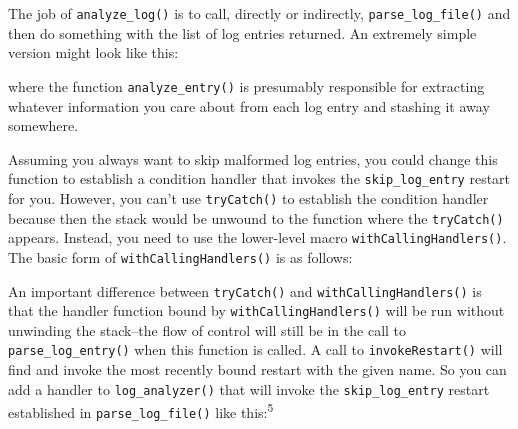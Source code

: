 \begin{Shaded}
\begin{Highlighting}[]
\StringTok{ }
  \StringTok{ }\NormalTok{()}
\NormalTok{\}}
\end{Highlighting}
\end{Shaded}

The job of \texttt{analyze\_log()} is to call, directly or indirectly,
\texttt{parse\_log\_file()} and then do something with the list of log
entries returned. An extremely simple version might look like this:

\begin{Shaded}
\begin{Highlighting}[]
\StringTok{ }
  \StringTok{ }
\NormalTok{\}}
\end{Highlighting}
\end{Shaded}

where the function \texttt{analyze\_entry()} is presumably responsible
for extracting whatever information you care about from each log entry
and stashing it away somewhere.

Assuming you always want to skip malformed log entries, you could change
this function to establish a condition handler that invokes the
\texttt{skip\_log\_entry} restart for you. However, you can't use
\texttt{tryCatch()} to establish the condition handler because then the
stack would be unwound to the function where the \texttt{tryCatch()}
appears. Instead, you need to use the lower-level macro
\texttt{withCallingHandlers()}. The basic form of
\texttt{withCallingHandlers()} is as follows:

\begin{Shaded}
\begin{Highlighting}[]
\NormalTok{(}
   
   
\NormalTok{)}
\end{Highlighting}
\end{Shaded}

An important difference between \texttt{tryCatch()} and
\texttt{withCallingHandlers()} is that the handler function bound by
\texttt{withCallingHandlers()} will be run without unwinding the
stack--the flow of control will still be in the call to
\texttt{parse\_log\_entry()} when this function is called. A call to
\texttt{invokeRestart()} will find and invoke the most recently bound
restart with the given name. So you can add a handler to
\texttt{log\_analyzer()} that will invoke the \texttt{skip\_log\_entry}
restart established in \texttt{parse\_log\_file()} like
this:\textsuperscript{5}

